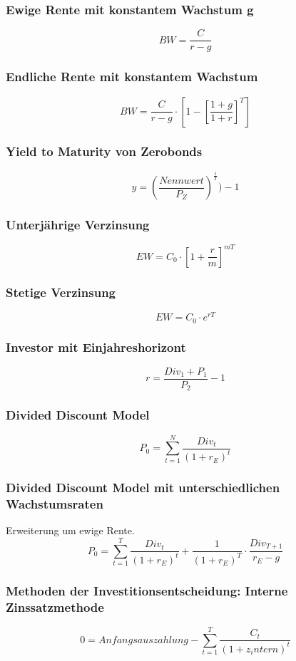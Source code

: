 \subsubsection{Ewige Rente mit konstantem Wachstum g}
\[BW = \frac{C}{r-g}\]

\subsubsection{Endliche Rente mit konstantem Wachstum}
\[BW = \frac{C}{r-g} \cdot [1-[\frac{1+g}{1+r}]^T]\]

\subsubsection{Yield to Maturity von Zerobonds}
\[y = (\frac{Nennwert}{P_Z})^{\frac{1}{T}})-1\]

\subsubsection{Unterjährige Verzinsung}
\[EW=C_0\cdot[1+\frac{r}{m}]^{mT}\]

\subsubsection{Stetige Verzinsung}
\[EW=C_0\cdot e^{rT}\]

\subsubsection{Investor mit Einjahreshorizont}
\[r = \frac{Div_1+P_1}{P_2}-1\]

\subsubsection{Divided Discount Model}
\[P_0 = \sum_{t=1}^{N} \frac{Div_t}{(1+r_E)^t}\]

\subsubsection{Divided Discount Model mit unterschiedlichen Wachstumsraten}
Erweiterung um ewige Rente.
\[P_0 = \sum_{t=1}^{T} \frac{Div_t}{(1+r_E)^t} + \frac{1}{(1+r_E)^T}\cdot\frac{Div_{T+1}}{r_E-g}\]

\subsubsection{Methoden der Investitionsentscheidung: Interne Zinssatzmethode}
\[0 = Anfangsauszahlung - \sum_{t=1}^{T}\frac{C_t}{(1+z_intern)^t}\]


